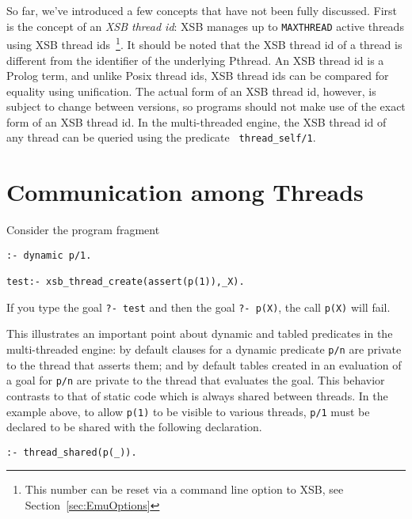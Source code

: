 So far, we've introduced a few concepts that have not been fully
discussed.  First is the concept of an {\em XSB thread id}: XSB
manages up to {\tt MAXTHREAD} active threads using XSB thread
ids~\footnote{This number can be reset via a command line option to
  XSB, see Section~\ref{sec:EmuOptions}}.  It should be noted that the
XSB thread id of a thread is different from the identifier of the
underlying Pthread.  An XSB thread id is a Prolog term, and unlike
Posix thread ids, XSB thread ids can be compared for equality using
unification.  The actual form of an XSB thread id, however, is subject
to change between versions, so programs should not make use of the
exact form of an XSB thread id.  In the multi-threaded engine, the XSB
thread id of any thread can be queried using the predicate {\tt
  thread\_self/1}.

\section{Communication among Threads}

\begin{example}
Consider the program fragment
%
\begin{verbatim}
:- dynamic p/1.

test:- xsb_thread_create(assert(p(1)),_X).
\end{verbatim}
If you type the goal {\tt ?- test} and then the goal {\tt ?- p(X)},
the call {\tt p(X)} will fail.  
\end{example}

\noindent
This illustrates an important point about dynamic and tabled
predicates in the multi-threaded engine: by default clauses for a
dynamic predicate {\tt p/n} are private to the thread that asserts
them; and by default tables created in an evaluation of a goal for
{\tt p/n} are private to the thread that evaluates the goal.  This
behavior contrasts to that of static code which is always shared
between threads.  In the example above, to allow {\tt p(1)} to be
visible to various threads, {\tt p/1} must be declared to be shared
with the following declaration.
%
\begin{verbatim}
:- thread_shared(p(_)).
\end{verbatim}

